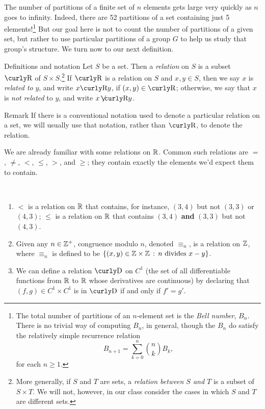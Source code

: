  The number of partitions of a finite set of $n$ elements gets
large very quickly as $n$ goes to infinity. Indeed, there are 52
partitions of a set containing just 5 elements!\footnote{The total
number of partitions of an $n$-element set is the \textit{Bell number},
$B_n$. There is no trivial way of computing $B_n$, in general,
though the $B_n$ do satisfy the relatively simple recurrence
relation $$B_{n+1}=\sum_{k=0}^n \binom{n}{k} B_k,$$ for each $n\geq 1$.}  But our goal here is not to count the number of
partitions of a given set, but rather to use particular partitions
of a group $G$ to help us study that group's structure.  We turn now
to our next definition.

\begin{df}{Definitions and notation} Let $S$ be a set.  Then a \textit{relation} on $S$ is a
subset $\R$ of $S\times S$.\footnote{More generally, if $S$ and
$T$ are sets, a \textit{relation between $S$ and $T$} is a subset
of $S \times T$. We will not, however, in our class consider
the cases in which $S$ and $T$ are different sets.} If $\R$ is
a relation on $S$ and $x,y\in S$, then we say $x$ is \textit{related to} $y$, and write $x\R y$, if $(x,y)\in \R$;
otherwise, we say that $x$ is \textit{not related} to $y$, and
write $x \not {\hspace{-4pt}\R} y$.\end{df}


\begin{df}{Remark} If there is a conventional notation used to denote
a particular relation on a set, we will usually use that notation,
rather than $\R$, to denote the relation.\end{df}

  We are already familiar with some relations on
$\mathbb{R}$. Common such relations are $=$, $\neq$, $<$, $\leq$, $>$,
and $\geq$; they contain exactly the elements we'd expect them to
contain.

\begin{example}{}\
\begin{enumerate}
\item $<$ is a relation on $\mathbb{R}$ that contains, for instance, $(3,4)$ but not
$(3,3)$ or $(4,3)$; $\leq$ is a relation on $\mathbb{R}$ that contains
$(3,4)$ \textbf{and} $(3,3)$ but not $(4,3)$.

\item Given any $n\in \mathbb{Z}^+$, congruence modulo $n$, denoted $\equiv_n$, is a
relation on $\mathbb{Z}$, where $\equiv_n$ is defined to be $\{(x,y) \in \mathbb{Z}
\times \mathbb{Z} \,:\, n \mbox{ divides }x-y\}$.

\item We can define a relation $\D$ on $C^1$ (the set of
    all differentiable functions from $\mathbb{R}$ to $\mathbb{R}$
    whose derivatives are continuous) by declaring that
    $(f,g)\in C^1 \times C^1$ is in $\D$ if and only if
    $f'=g'$. \end{enumerate}
\end{example}

